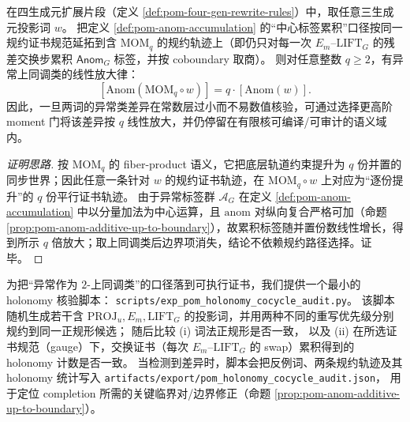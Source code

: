 \begin{proposition}\label{prop:pom-anom-moment-amplification}
在四生成元扩展片段（定义 \ref{def:pom-four-gen-rewrite-rules}）中，取任意三生成元投影词 \(w\)。
把定义 \ref{def:pom-anom-accumulation} 的“中心标签累积”口径按同一规约证书规范延拓到含 \(\mathrm{MOM}_q\) 的规约轨迹上（即仍只对每一次 \(E_m\)--\(\mathrm{LIFT}_G\) 的残差交换步累积 \(\mathsf{Anom}_G\) 标签，并按 coboundary 取商）。
则对任意整数 \(q\ge 2\)，有异常上同调类的线性放大律：
\[
\boxed{\;
[\mathrm{Anom}(\mathrm{MOM}_q\circ w)]
=
q\cdot [\mathrm{Anom}(w)].\;}
\]
因此，一旦两词的异常类差异在常数层过小而不易数值核验，可通过选择更高阶 moment 门将该差异按 \(q\) 线性放大，并仍停留在有限核可编译/可审计的语义域内。
\end{proposition}

\begin{proof}[证明思路]
按 \(\mathrm{MOM}_q\) 的 fiber-product 语义，它把底层轨道约束提升为 \(q\) 份并置的同步世界；因此任意一条针对 \(w\) 的规约证书轨迹，在 \(\mathrm{MOM}_q\circ w\) 上对应为“逐份提升”的 \(q\) 份平行证书轨迹。
由于异常标签群 \(\mathcal{A}_G\) 在定义 \ref{def:pom-anom-accumulation} 中以分量加法为中心运算，且 \(\mathrm{anom}\) 对纵向复合严格可加（命题 \ref{prop:pom-anom-additive-up-to-boundary}），故累积标签随并置份数线性增长，得到所示 \(q\) 倍放大；取上同调类后边界项消失，结论不依赖规约路径选择。证毕。
\end{proof}

\begin{remark}\label{rem:pom-holonomy-cocycle-audit}
为把“异常作为 \(2\)-上同调类”的口径落到可执行证书，我们提供一个最小的 holonomy 核验脚本：
\texttt{scripts/exp\_pom\_holonomy\_cocycle\_audit.py}。
该脚本随机生成若干含 \(\mathrm{PROJ}_u,E_m,\mathrm{LIFT}_G\) 的投影词，并用两种不同的重写优先级分别规约到同一正规形候选；
随后比较
(i) 词法正规形是否一致，
以及
(ii) 在所选证书规范（gauge）下，交换证书（每次 \(E_m\)--\(\mathrm{LIFT}_G\) 的 swap）累积得到的 holonomy 计数是否一致。
当检测到差异时，脚本会把反例词、两条规约轨迹及其 holonomy 统计写入
\texttt{artifacts/export/pom\_holonomy\_cocycle\_audit.json}，
用于定位 completion 所需的关键临界对/边界修正（命题 \ref{prop:pom-anom-additive-up-to-boundary}）。
\end{remark}

